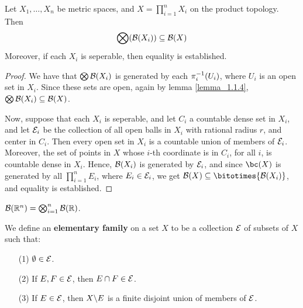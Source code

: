 \begin{lemma}\label{lemma_1.1.8}
    Let $X_1, \dots, X_n$ be metric spaces, and $X=\prod_{i=1}^n{X_i}$ on the
    product topology. Then
    \begin{equation*}
        \bigotimes(\mathcal{B}(X_i)) \subseteq \mathcal{B}(X)
    \end{equation*}
    Moreover, if each $X_i$ is seperable, then equality is established.
\end{lemma}
\begin{proof}
    We have that $\bigotimes{\mathcal{B}(X_i)}$ is generated by each $\pi_i^{-1}(U_i)$,
    where $U_i$ is an open set in  $X_i$. Since these sets are open, again by
    lemma \ref{lemma_1.1.4}, $\bigotimes{\mathcal{B}(X_i)} \subseteq \mathcal{B}(X)$.

    Now, suppose that each $X_i$ is seperable, and let  $C_i$ a countable dense
    set in  $X_i$, and let  $\mathcal{E}_i$ be the collection of all open balls in
    $X_i$ with rational radius $r$, and center in $C_i$. Then every open set in
     $X_i$ is a countable union of members of  $\mathcal{E}_i$. Moreover, the set of
     points in $X$ whose $i$-th coordinate is in $C_i$, for all $i$, is
     countable dense in $X_i$. Hence, $\mathcal{B}(X_i)$ is generated by $\mathcal{E}_i$, and
     since  $\bc(X)$ is generated by all $\prod_{i=1}^n{E_i}$, where $E_i \in
     \mathcal{E}_i$, we get $\Bc(X) \subseteq \bitotimes{\Bc(X_i)}$, and equality is
     established.
\end{proof}
\begin{corollary}
    $\mathcal{B}(\mathbb{R}^n)=\bigotimes_{i=1}^n{\mathcal{B}(\mathbb{R})}$.
\end{corollary}

\begin{definition}
    We define an \textbf{elementary family} on a set $X$ to be a collection
    $\mathcal{E}$ of subsets of $X$ such that:
    \begin{enumerate}
        \item[(1)] $\emptyset \in \mathcal{E}$.

        \item[(2)] If $E, F \in \mathcal{E}$, then $E \cap F \in \mathcal{E}$.

        \item[(3)] If $E \in \mathcal{E}$, then $X \backslash E$ is a finite disjoint union
            of members of $\mathcal{E}$.
    \end{enumerate}
\end{definition}

